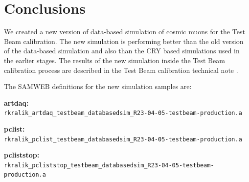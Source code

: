 \documentclass[12pt]{article}
\begin{document}
\section{Conclusions}
We created a new version of data-based simulation of cosmic muons for the Test Beam calibration. The new simulation is performing better than the old version of the data-based simulation and also than the CRY based simulations used in the earlier stages. The results of the new simulation inside the Test Beam calibration process are described in the Test Beam calibration technical note \cite{NOVA-doc-60592}.

The SAMWEB definitions for the new simulation samples are:

\textbf{artdaq:}\\
\texttt{rkralik\_artdaq\_testbeam\_databasedsim\_R23-04-05-testbeam-production.a}

\textbf{pclist:}\\
\texttt{rkralik\_pclist\_testbeam\_databasedsim\_R23-04-05-testbeam-production.a}

\textbf{pcliststop:}\\
\texttt{rkralik\_pcliststop\_testbeam\_databasedsim\_R23-04-05-testbeam-production.a}



\end{document}
